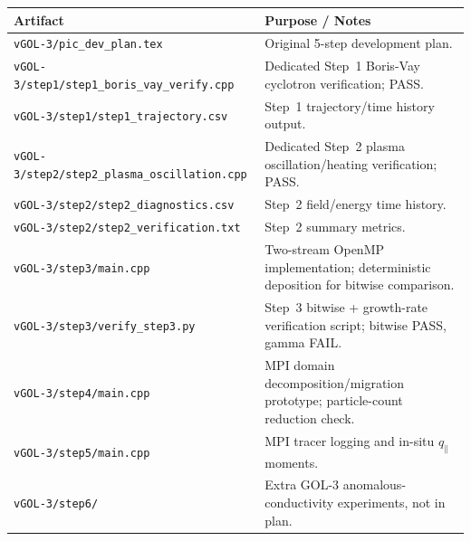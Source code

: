 \documentclass[11pt,a4paper]{article}
\begin{document}
\begin{longtable}{>{\raggedright\arraybackslash}p{}>{\raggedright\arraybackslash}p{}}
\toprule
\textbf{Artifact} & \textbf{Purpose / Notes} \\
\midrule
\endhead
\texttt{vGOL-3/pic\_dev\_plan.tex} & Original 5-step development plan. \\
\texttt{vGOL-3/step1/step1\_boris\_vay\_verify.cpp} & Dedicated Step~1 Boris-Vay cyclotron verification; PASS. \\
\texttt{vGOL-3/step1/step1\_trajectory.csv} & Step~1 trajectory/time history output. \\
\texttt{vGOL-3/step2/step2\_plasma\_oscillation.cpp} & Dedicated Step~2 plasma oscillation/heating verification; PASS. \\
\texttt{vGOL-3/step2/step2\_diagnostics.csv} & Step~2 field/energy time history. \\
\texttt{vGOL-3/step2/step2\_verification.txt} & Step~2 summary metrics. \\
\texttt{vGOL-3/step3/main.cpp} & Two-stream OpenMP implementation; deterministic deposition for bitwise comparison. \\
\texttt{vGOL-3/step3/verify\_step3.py} & Step~3 bitwise + growth-rate verification script; bitwise PASS, gamma FAIL. \\
\texttt{vGOL-3/step4/main.cpp} & MPI domain decomposition/migration prototype; particle-count reduction check. \\
\texttt{vGOL-3/step5/main.cpp} & MPI tracer logging and in-situ $q_\parallel$ moments. \\
\texttt{vGOL-3/step6/} & Extra GOL-3 anomalous-conductivity experiments, not in plan. \\
\bottomrule
\end{longtable}
\end{document}
